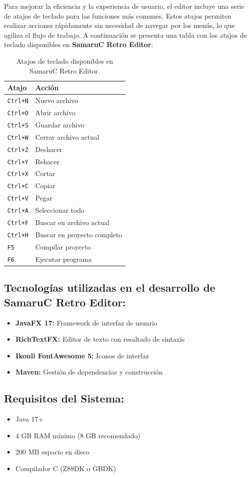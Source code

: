 \documentclass[../../main.tex]{subfiles}
\begin{document}
\par{Para mejorar la eficiencia y la experiencia de usuario, el editor incluye una serie de atajos de teclado para las funciones más comunes. Estos atajos permiten realizar acciones rápidamente sin necesidad de navegar por los menús, lo que agiliza el flujo de trabajo. A continuación se presenta una tabla con los atajos de teclado disponibles en \textbf{SamaruC Retro Editor}:}
\begin{table}[ht]
    \centering
    \small
    \begin{tabular}{p{3cm}p{6cm}}
        \toprule
            \textbf{Atajo} & \textbf{Acción} \\
        \midrule
            \texttt{Ctrl+N} & Nuevo archivo \\
            \texttt{Ctrl+O} & Abrir archivo \\
            \texttt{Ctrl+S} & Guardar archivo \\
            \texttt{Ctrl+W} & Cerrar archivo actual \\
            \texttt{Ctrl+Z} & Deshacer \\
            \texttt{Ctrl+Y} & Rehacer \\
            \texttt{Ctrl+X} & Cortar \\
            \texttt{Ctrl+C} & Copiar \\
            \texttt{Ctrl+V} & Pegar \\
            \texttt{Ctrl+A} & Seleccionar todo \\
            \texttt{Ctrl+F} & Buscar en archivo actual \\
            \texttt{Ctrl+H} & Buscar en proyecto completo \\
            \texttt{F5} & Compilar proyecto \\
            \texttt{F6} & Ejecutar programa \\
        \bottomrule
    \end{tabular}
    \caption{Atajos de teclado disponibles en SamaruC Retro Editor.}
    \label{tab:atajos_teclado}
\end{table}

\subsection{Tecnologías utilizadas en el desarrollo de SamaruC Retro Editor:}
\begin{itemize}
    \item \textbf{JavaFX 17:} Framework de interfaz de usuario
    \item \textbf{RichTextFX:} Editor de texto con resaltado de sintaxis
    \item \textbf{Ikonli FontAwesome 5:} Iconos de interfaz
    \item \textbf{Maven:} Gestión de dependencias y construcción
\end{itemize}

\clearpage

\subsection{Requisitos del Sistema:}
\begin{itemize}
    \item Java 17+
    \item 4 GB RAM mínimo (8 GB recomendado)
    \item 200 MB espacio en disco
    \item Compilador C (Z88DK o GBDK)
\end{itemize}
\end{document}
